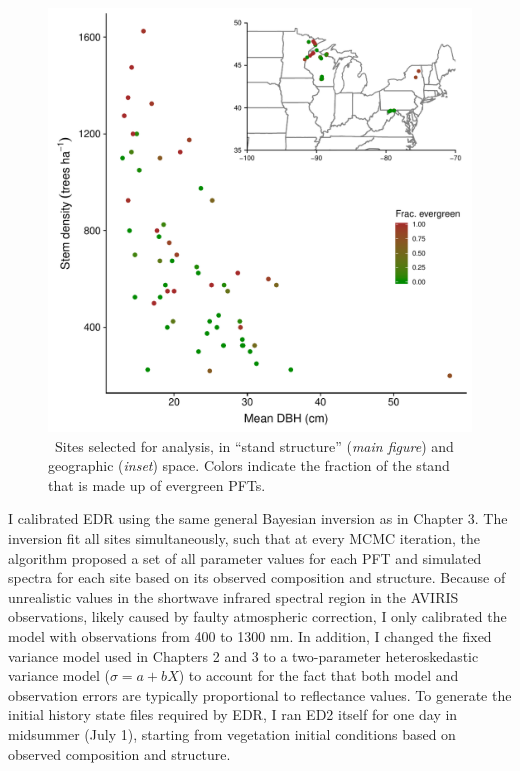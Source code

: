 \begin{figure}
  \centering
  \includegraphics[width=\textwidth]{figures/sites_both.pdf}
  \caption{\
    Sites selected for analysis, in ``stand structure'' (\textit{main figure}) and geographic (\textit{inset}) space.
    Colors indicate the fraction of the stand that is made up of evergreen PFTs.
  }\label{fig:sites}
\end{figure}

I calibrated EDR using the same general Bayesian inversion as in Chapter 3.
The inversion fit all sites simultaneously, such that at every MCMC iteration, the algorithm proposed a set of all parameter values for each PFT and simulated spectra for each site based on its observed composition and structure.
Because of unrealistic values in the shortwave infrared spectral region in the AVIRIS observations, likely caused by faulty atmospheric correction, I only calibrated the model with observations from 400 to 1300 nm.
In addition, I changed the fixed variance model used in Chapters 2 and 3 to a two-parameter heteroskedastic variance model ($\sigma = a + bX$) to account for the fact that both model and observation errors are typically proportional to reflectance values.
To generate the initial history state files required by EDR, I ran ED2 itself for one day in midsummer (July 1), starting from vegetation initial conditions based on observed composition and structure.

